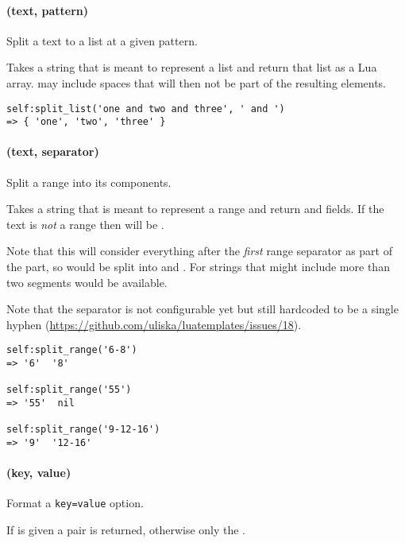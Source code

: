 \documentclass[12pt]{scrartcl}
\begin{document}
\paragraph{ (text, pattern)}

Split a text to a list at a given pattern.

\noindent Takes a string that is meant to represent a list and return that list as a Lua array.   may include spaces that will then not be part of the resulting elements.

\begin{verbatim}
self:split_list('one and two and three', ' and ')
=> { 'one', 'two', 'three' }
\end{verbatim}


\paragraph{ (text, separator)}

Split a range into its components.

\noindent Takes a string that is meant to represent a range and return
 and  fields.  If the text is \emph{not} a range then
 will be .

Note that this will consider everything after the \emph{first} range separator
as part of the  part, so  would be split into 
and . For strings that might include more than two segments
 would be available.

Note that the separator is not configurable yet but still hardcoded to be a
single hyphen (\url{https://github.com/uliska/luatemplates/issues/18}).

\begin{verbatim}
self:split_range('6-8')
=> '6'  '8'

self:split_range('55')
=> '55'  nil

self:split_range('9-12-16')
=> '9'  '12-16'
\end{verbatim}


\paragraph{ (key, value)}

Format a \texttt{key=value} option.

\noindent If  is given a \value{key=value} pair is returned,
otherwise only the .
\end{document}
